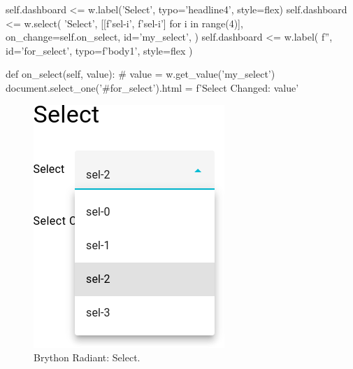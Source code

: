 \begin{python}
    self.dashboard <= w.label('Select', typo='headline4', style=flex)
    self.dashboard <= w.select(
        'Select',
        [[f'sel-{i}', f'sel-{i}'] for i in range(4)],
        on_change=self.on_select,
        id='my_select',
    )
    self.dashboard <= w.label(
        f'', id='for_select', typo=f'body1', style=flex
    )


def on_select(self, value):
    # value = w.get_value('my_select')
    document.select_one('#for_select').html = f'Select Changed: {value}'
\end{python}


\begin{figure}[H]
\begin{centering}
\includegraphics[scale=0.5]{Cap4/Figures/widgets/select.png}
\par\end{centering}
\caption[Brython Radiant: Select]{Brython Radiant: Select.}
\label{fig:radiant_select}
\end{figure}